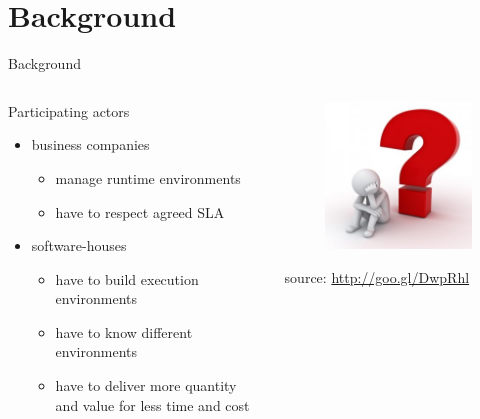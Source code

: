 %
%
\section{Background}
\begin{frame}{Background}
	\begin{columns}
		\begin{column}{0.7\textwidth}
			Participating actors
			\begin{itemize}
				\item{\footnotesize{business companies}}
				\begin{itemize}
					\item{\scriptsize{manage runtime environments}}
					\item{\scriptsize{have to respect agreed SLA}}
				\end{itemize}
				\item{\footnotesize{software-houses}}
				\begin{itemize}
					\item{\scriptsize{have to build execution environments}}
					\item{\scriptsize{have to know different environments}}
					\item{\scriptsize{have to deliver more quantity and value for less time and cost}}
				\end{itemize}
			\end{itemize}
		\end{column}
		\begin{column}{0.3\textwidth}
			\begin{figure}
				\centering{}
				\includegraphics[scale=0.3]{images/problem.png}
			\end{figure}
			\begin{flushright}
				\tiny{source: \url{http://goo.gl/DwpRhl}}
			\end{flushright}
		\end{column}
	\end{columns}
\end{frame}

